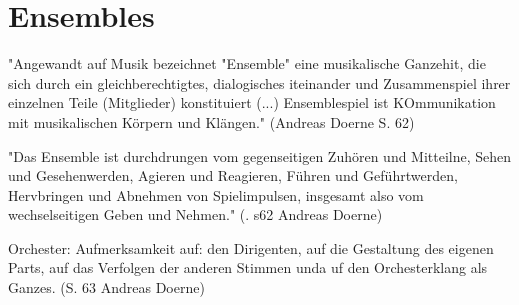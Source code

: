 \section{Ensembles}


"Angewandt auf Musik bezeichnet "Ensemble" eine musikalische Ganzehit, die sich
durch ein gleichberechtigtes, dialogisches iteinander und Zusammenspiel ihrer
einzelnen Teile (Mitglieder) konstituiert (...) Ensemblespiel ist KOmmunikation
mit musikalischen Körpern und Klängen." (Andreas Doerne S. 62)

"Das Ensemble ist durchdrungen vom gegenseitigen Zuhören und Mitteilne, Sehen
und Gesehenwerden, Agieren und Reagieren, Führen und Geführtwerden, Hervbringen
und Abnehmen von Spielimpulsen, insgesamt also vom wechselseitigen Geben und
Nehmen." (. s62 Andreas Doerne)


Orchester:
Aufmerksamkeit auf: den Dirigenten, auf die Gestaltung des eigenen Parts, auf
das Verfolgen der anderen Stimmen unda uf den Orchesterklang als Ganzes. (S. 63
Andreas Doerne)

